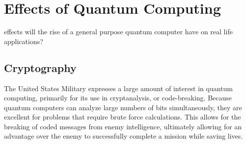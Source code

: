 \documentclass[10pt,journal,compsoc]{IEEEtran}
\begin{document}
%






\section{Effects of Quantum Computing}
 effects will the rise of a general purpose quantum computer have on real life applications?
\subsection{Cryptography}
The United States Military expresses a large amount of interest in quantum computing, primarily for its use in cryptanalysis, or code-breaking. Because quantum computers can analyze large numbers of bits simultaneously, they are excellent for problems that require brute force calculations. This allows for the breaking of coded messages from enemy intelligence, ultimately allowing for an advantage over the enemy to successfully complete a mission while saving lives. 
\end{document}
